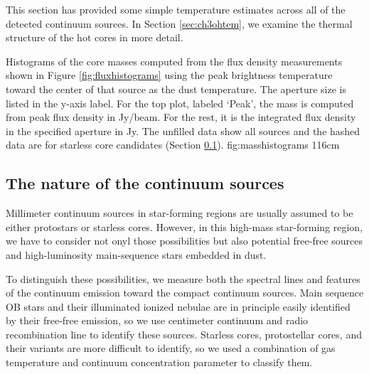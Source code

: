 \documentclass{emulateapj}
\begin{document}
This section has provided some simple temperature estimates across all of the
detected continuum sources.  In Section \ref{sec:ch3ohtem}, we  examine
the thermal structure of the hot cores in more detail.



{Histograms of the core masses computed from the flux density measurements
shown in Figure \ref{fig:fluxhistograms} using the peak brightness temperature 
toward the center of that source as the dust temperature.
The aperture size is listed in the y-axis label.  For the top plot, labeled
`Peak', the mass is computed from peak
flux density in Jy/beam.  For the rest, it is the integrated flux density in
the specified aperture in Jy.  The unfilled data show all sources and the
hashed
data are for starless core candidates (Section \ref{sec:contsourcenature}).}
{fig:masshistograms}
{1}{16cm}

\subsection{The nature of the continuum sources}
\label{sec:contsourcenature}
Millimeter continuum sources in star-forming regions are usually assumed to be
either protostars or starless cores.  However, in this high-mass star-forming
region, we have to consider not onyl those possibilities but also potential
free-free sources and high-luminosity main-sequence stars embedded in dust.

To distinguish these possibilities, we measure both the spectral lines and
features of the continuum emission toward the compact continuum sources.  Main
sequence OB stars and their illuminated ionized nebulae are in principle easily
identified by their free-free emission, so we use centimeter continuum and
radio recombination line to identify these sources.  Starless cores,
protostellar cores, and their variants are more difficult to identify, so we
used a combination of gas temperature and continuum concentration parameter to
classify them.
\end{document}
